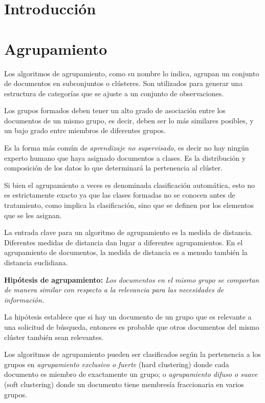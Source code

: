 \documentclass{llncs}
\begin{document}
\newpage
{}

\section{Introducci\'on}

\section{Agrupamiento}

Los algoritmos de agrupamiento, como su nombre lo indica, agrupan un conjunto de documentos en subconjuntos o clústeres. Son utilizados para generar una estructura de categorías que se ajuste a un conjunto de observaciones. 

Los grupos formados deben tener un alto grado de asociación entre los documentos de un mismo grupo, es decir, deben ser lo m\'as similares posibles, y un bajo grado entre miembros de diferentes grupos. 

Es la forma más común de \textit{aprendizaje no supervisado}, es decir no hay ningún experto humano que haya asignado documentos a clases. Es la distribución y composición de los datos lo que determinará la pertenencia al clúster. 

Si bien el agrupamiento a veces es denominada clasificación automática, esto no es estrictamente exacto ya que las clases formadas no se conocen antes de tratamiento, como implica la clasificación, sino que se definen por los elementos que se les asignan.

La entrada clave para un algoritmo de agrupamiento es la medida de distancia. Diferentes medidas de distancia dan lugar a diferentes agrupamientos. En el agrupamiento de documentos, la medida de distancia es a menudo también la distancia euclidiana. 

\vspace{1em}
\textbf{Hip\'otesis de agrupamiento:} \textit{Los documentos en el mismo grupo se comportan de manera similar con respecto a la relevancia para las necesidades de información.}
	
\vspace{0.3em}
La hipótesis establece que si hay un documento de un grupo que es relevante a una solicitud de búsqueda, entonces es probable que otros documentos del mismo clúster también sean relevantes. 

\vspace{1em}
Los algoritmos de agrupamiento pueden ser clasificados seg\'un la pertenencia a los grupos en \textit{agrupamiento exclusivo o fuerte} (hard clustering) donde cada documento es miembro de exactamente un grupo; o \textit{agrupamiento difuso o suave} (soft clustering) donde un documento tiene membresía fraccionaria en varios grupos.
\end{document}
